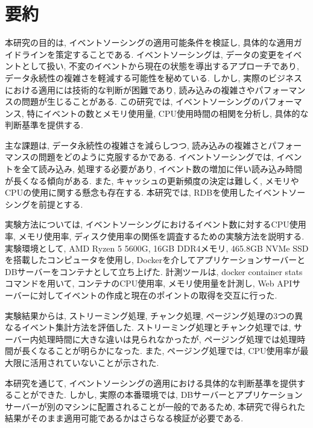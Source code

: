 \documentclass[../../main]{subfiles}
\begin{document}
    \section{要約}\label{sec:phraseology}

    本研究の目的は, イベントソーシングの適用可能条件を検証し, 具体的な適用ガイドラインを策定することである. イベントソーシングは, データの変更をイベントとして扱い, 不変のイベントから現在の状態を導出するアプローチであり, データ永続性の複雑さを軽減する可能性を秘めている. しかし, 実際のビジネスにおける適用には技術的な判断が困難であり, 読み込みの複雑さやパフォーマンスの問題が生じることがある. この研究では, イベントソーシングのパフォーマンス, 特にイベントの数とメモリ使用量, CPU使用時間の相関を分析し, 具体的な判断基準を提供する.

    主な課題は, データ永続性の複雑さを減らしつつ, 読み込みの複雑さとパフォーマンスの問題をどのように克服するかである. イベントソーシングでは, イベントを全て読み込み, 処理する必要があり, イベント数の増加に伴い読み込み時間が長くなる傾向がある. また, キャッシュの更新頻度の決定は難しく, メモリやCPUの使用に関する懸念も存在する. 本研究では, RDBを使用したイベントソーシングを前提とする.

    実験方法については, イベントソーシングにおけるイベント数に対するCPU使用率, メモリ使用率, ディスク使用率の関係を調査するための実験方法を説明する. 実験環境として, AMD Ryzen 5 5600G, 16GB DDR4メモリ, 465.8GB NVMe SSDを搭載したコンピュータを使用し, Dockerを介してアプリケーションサーバーとDBサーバーをコンテナとして立ち上げた. 計測ツールは, docker container statsコマンドを用いて, コンテナのCPU使用率, メモリ使用量を計測し, Web APIサーバーに対してイベントの作成と現在のポイントの取得を交互に行った.

    実験結果からは, ストリーミング処理, チャンク処理, ページング処理の3つの異なるイベント集計方法を評価した. ストリーミング処理とチャンク処理では, サーバー内処理時間に大きな違いは見られなかったが, ページング処理では処理時間が長くなることが明らかになった. また, ページング処理では, CPU使用率が最大限に活用されていないことが示された.

    本研究を通じて, イベントソーシングの適用における具体的な判断基準を提供することができた. しかし, 実際の本番環境では, DBサーバーとアプリケーションサーバーが別のマシンに配置されることが一般的であるため, 本研究で得られた結果がそのまま適用可能であるかはさらなる検証が必要である.

    \clearpage
\end{document}
